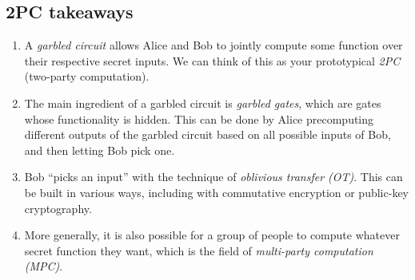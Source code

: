 \subsection{2PC takeaways}

\begin{enumerate}
\item
  A \emph{garbled circuit} allows Alice and Bob to jointly compute some
  function over their respective secret inputs. We can think of this as
  your prototypical \emph{2PC} (two-party computation).
\item
  The main ingredient of a garbled circuit is \emph{garbled gates},
  which are gates whose functionality is hidden. This can be done by
  Alice precomputing different outputs of the garbled circuit based on
  all possible inputs of Bob, and then letting Bob pick one.
\item
  Bob ``picks an input'' with the technique of \emph{oblivious transfer
  (OT)}. This can be built in various ways, including with commutative
  encryption or public-key cryptography.
\item
  More generally, it is also possible for a group of people to compute
  whatever secret function they want, which is the field of
  \emph{multi-party computation (MPC)}.
\end{enumerate}
